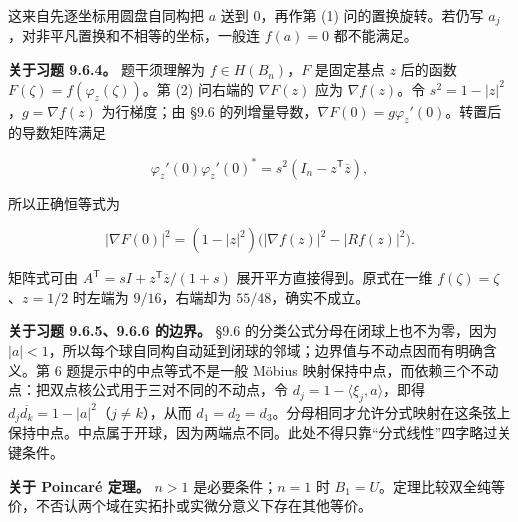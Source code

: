 \documentclass[11pt,a4paper]{article}
\begin{document}
这来自先逐坐标用圆盘自同构把 \(a\) 送到 \(0\)，再作第 (1)
问的置换旋转。若仍写 \(a_j\)，对非平凡置换和不相等的坐标，一般连
\(f(a)=0\) 都不能满足。

\textbf{关于习题 9.6.4。} 题干须理解为 \(f\in H(B_n)\)，\(F\) 是固定基点
\(z\) 后的函数 \(F(\zeta)=f(\varphi_z(\zeta))\)。第 (2) 问右端的
\(\nabla F(z)\) 应为 \(\nabla f(z)\)。令
\(s^2=1-|z|^2\)，\(g=\nabla f(z)\) 为行梯度；由 §9.6
的列增量导数，\(\nabla F(0)=g\varphi_z'(0)\)。转置后的导数矩阵满足

\[
\varphi_z'(0)\varphi_z'(0)^*
=s^2(I_n-z^{\mathsf T}\overline z),
\]

所以正确恒等式为

\[
|\nabla F(0)|^2=(1-|z|^2)\bigl(|\nabla f(z)|^2-|Rf(z)|^2\bigr).
\]

矩阵式可由 \(A^{\mathsf T}=sI+z^{\mathsf T}\overline z/(1+s)\)
展开平方直接得到。原式在一维 \(f(\zeta)=\zeta\)、\(z=1/2\) 时左端为
\(9/16\)，右端却为 \(55/48\)，确实不成立。

\textbf{关于习题 9.6.5、9.6.6 的边界。} §9.6
的分类公式分母在闭球上也不为零，因为
\(|a|<1\)，所以每个球自同构自动延到闭球的邻域；边界值与不动点因而有明确含义。第
6 题提示中的中点等式不是一般 Möbius
映射保持中点，而依赖三个不动点：把双点核公式用于三对不同的不动点，令
\(d_j=1-\langle\xi_j,a\rangle\)，即得
\(d_j\overline{d_k}=1-|a|^2\)（\(j\ne k\)），从而
\(d_1=d_2=d_3\)。分母相同才允许分式映射在这条弦上保持中点。中点属于开球，因为两端点不同。此处不得只靠``分式线性''四字略过关键条件。

\textbf{关于 Poincaré 定理。} \(n>1\) 是必要条件；\(n=1\) 时
\(B_1=U\)。定理比较双全纯等价，不否认两个域在实拓扑或实微分意义下存在其他等价。
\end{document}

